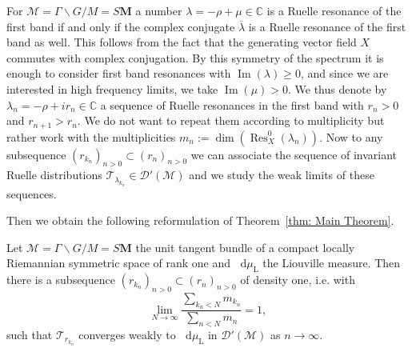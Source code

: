 \documentclass[AHL, Unicode, longabstracts, published]{cedram}
\DeclareMathOperator{\Res}{Res}
\DeclareMathOperator{\Imag}{Im}
\newcommand{\rml}{\mathrm{L}}
\newcommand{\mc}{\mathcal}
\newcommand{\cc}{\mathbb{C}}
\newcommand{\bfm}{\mathbf{M}}
\newcommand{\la}{\lambda}
\newcommand{\bbar}{\overline}
\let\Im=\Imag
\renewcommand{\Im}{\operatorname{Im}}
\newcommand{\intd}{\mathop{}\!\mathrm{d}}
\begin{document}
For $\mc{M} = \Gamma\backslash G/M=S{\bfm}$ a number $\la=-\rho+\mu \in\cc$ is a Ruelle resonance of the first band if and only if the complex conjugate $\bbar{\la}$ is a Ruelle resonance of the first band as well. This follows from the fact that the generating vector field $X$ commutes with complex conjugation. By this symmetry of the spectrum it is enough to consider first band resonances with $\Im(\la)\geq 0$, and since we are interested in high frequency limits, we take $\Im(\mu)>0$. We thus denote by $\la_n=-\rho+ir_n\in\cc$ a sequence of Ruelle resonances in the first band with $r_n >0$ and $r_{n+1}> r_n$. We do not want to repeat them according to multiplicity but rather work with the multiplicities $m_n := \dim(\Res^0_{X}(\la_n))$. Now to any subsequence $(r_{k_n})_{n>0} \subset (r_{n})_{n>0}$ we can associate the sequence of invariant Ruelle distributions $\mathcal T_{\la_{k_n}} \in \mc{D}'(\mc{M})$ and we study the weak limits of these sequences.

Then we obtain the following reformulation of Theorem~\ref{thm: Main Theorem}.

\begin{theo}\label{thm:hyperclassical}
Let $\mc{M} = \Gamma\backslash G/M=S{\bfm}$ the unit tangent bundle of a compact locally Riemannian symmetric space of rank one and $\intd\mu_{\rml}$ the Liouville measure. Then there is a subsequence $(r_{k_n})_{n>0} \subset (r_{n})_{n>0}$ of density one, i.e. with
\[
\lim_{N\to\infty}\frac{\sum_{k_n<N} m_{k_n}}{\sum_{n<N} m_{n}}=1,
\]
such that $\mathcal T_{r_{k_n}}$ converges weakly to $\intd \mu_{\rml}$ in $\mc{D}'(\mathcal M)$ as $n\to\infty$.
\end{theo}
\end{document}
